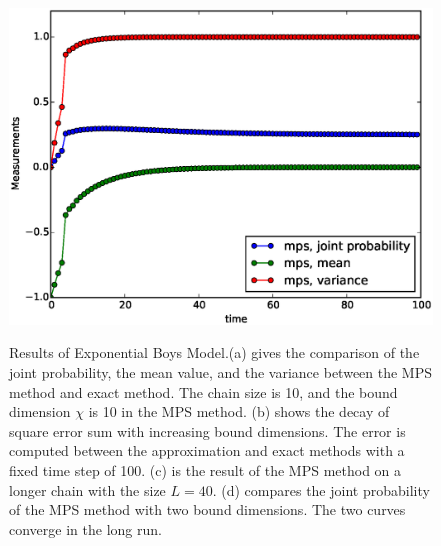 \begin{figure}[htbp]
{\includegraphics[scale=0.4]{Result_Fig/Exponential_MPS_t100_s40_bd10.eps}}\hfill
{}
  \caption{Results of Exponential Boys Model.(a) gives the comparison of the joint probability, the mean value, and the variance between the MPS method and exact method. The chain size is 10, and the bound dimension $\chi$ is 10 in the MPS method. (b) shows the decay of square error sum with increasing bound dimensions. The error is computed between the approximation and exact methods with a fixed time step of 100. (c) is the result of the MPS method on a longer chain with the size $L=40$. (d) compares the joint probability of the MPS method with two bound dimensions. The two curves converge in the long run.}
  \label{fig:Exponential_result}
\end{figure}

